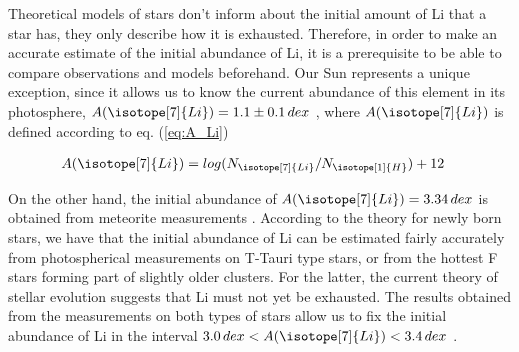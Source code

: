 \documentclass[fleqn,usenatbib]{mnras}
\begin{document}
Theoretical models of stars don't inform about the initial amount of Li that a star has, they only describe how it is exhausted. Therefore, in order to make an accurate estimate of the initial abundance of Li, it is a prerequisite to be able to compare observations and models beforehand. Our Sun represents a unique exception, since it allows us to know the current abundance of this element in its photosphere, $A(\isotope[7]{Li}) = 1.1 \pm 0.1 \, dex$ \citep{Jeffries2004}, where $A(\isotope[7]{Li})$ is defined according to eq. (\ref{eq:A_Li})\par


\begin{ceqn}
\begin{align}
    A(\isotope[7]{Li}) &= log(N_{\isotope[7]{Li}} / N_{\isotope[1]{H}}) + 12
    \label{eq:A_Li}
\end{align}
\end{ceqn}

On the other hand, the initial abundance of $A(\isotope[7]{Li}) = 3.34 \, dex$ is obtained from meteorite measurements \citep{Randich2006}. According to the theory for newly born stars, we have that the initial abundance of Li can be estimated fairly accurately from photospherical measurements on T-Tauri type stars, or from the hottest F stars forming part of slightly older clusters. For the latter, the current theory of stellar evolution suggests that Li must not yet be exhausted. The results obtained from the measurements on both types of stars allow us to fix the initial abundance of Li in the interval $3.0 \, dex < A(\isotope[7]{Li}) < 3.4 \, dex$ \citep{Randich2006}.\par
\end{document}
